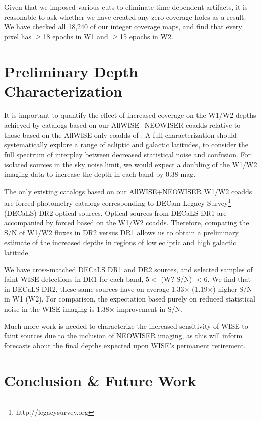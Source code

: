 \documentclass{emulateapj}
\begin{document}
Given that we imposed various cuts to eliminate time-dependent artifacts,
it is reasonable to ask whether we have created any zero-coverage holes
as a result. We have checked all 18,240 of our integer coverage maps, and find
that every pixel has $\ge$18 epochs in W1 and $\ge$15 epochs in W2.


\section{Preliminary Depth Characterization}
\label{sec:depth}

It is important to quantify the effect of increased coverage on
the W1/W2 depths achieved by catalogs based on our AllWISE+NEOWISER coadds 
relative to those based on the AllWISE-only coadds of \cite{lang14}. A
full characterization should systematically explore a range of 
ecliptic and galactic latitudes, to consider the full spectrum of interplay
between decreased statistical noise and confusion. For isolated sources in the 
sky noise limit, we would expect a doubling of the W1/W2 imaging data
to increase the depth in each band by 0.38 mag.

The only existing catalogs based on our AllWISE+NEOWISER W1/W2 coadds
are forced photometry catalogs corresponding to DECam Legacy
Survey\footnote{http://legacysurvey.org} (DECaLS) DR2 optical sources. 
Optical sources from DECaLS DR1 are accompanied by forced based on the
\cite{lang14} W1/W2 coadds. Therefore, comparing the S/N of W1/W2
fluxes in DR2 versus DR1 allows us to obtain a preliminary estimate of the 
increased depths in regions of low ecliptic and high galactic latitude.

We have cross-matched DECaLS DR1 and DR2 sources, and selected samples of
faint WISE detections in DR1 for each band, $5<$ (W? S/N) $<6$. We find that
in DECaLS DR2, these same sources have on average 1.33$\times$ (1.19$\times$)
higher S/N in W1 (W2). For comparison, the expectation based purely on
reduced statistical noise in the WISE imaging is 1.38$\times$ improvement in
S/N.

Much more work is needed to characterize the increased sensitivity
of WISE to faint sources due to the inclusion of NEOWISER
imaging, as this will inform forecasts about the final depths expected
upon WISE's permanent retirement.

\section{Conclusion \& Future Work}
\label{sec:future}
\end{document}

